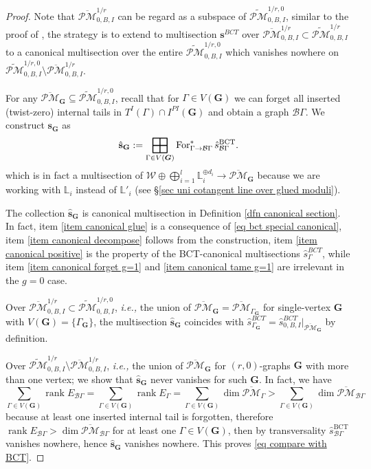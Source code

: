 \documentclass[11pt]{amsart}
\theoremstyle{definition}
\theoremstyle{remark}
\newcommand{\oPMb}{{\overline{\mathcal{PM}}}}
\newcommand{\<}{\left<}
\renewcommand{\>}{\right>}
\numberwithin{equation}{section}
\DeclareMathOperator{\rk}{rank}
\DeclareMathOperator*{\bboxplus}{\scalerel*{\boxplus}{\sum}}
\begin{document}
    
    \begin{proof}
        Note that $\oPMb^{1/r}_{0,B,I}$ can be regard as a subspace of $\widetilde{\mathcal{PM}}^{1/r,0}_{0,B,I}$, similar to the proof of \cite[Theorem 5.2]{TZ2}, the strategy is to extend to multisection $\mathbf{s}^{BCT}$ over $\oPMb^{1/r}_{0,B,I}\subset \widetilde{\mathcal{PM}}^{1/r}_{0,B,I}$ to a canonical multisection over the entire $\widetilde{\mathcal{PM}}^{1/r,0}_{0,B,I}$ which vanishes nowhere on $\widetilde{\mathcal{PM}}^{1/r,0}_{0,B,I} \setminus \oPMb^{1/r}_{0,B,I}$.

        

    For any $\oPMb_{\bm{G}}\subseteq \widetilde{\mathcal{PM}}^{1/r,0}_{0,B,I} $, recall that for $\Gamma \in V(\bm{G})$ we can forget all inserted (twist-zero) internal tails in $T^I(\Gamma)\cap I^{PI}(\bm{G})$ and obtain a graph $\mathcal B \Gamma$. We construct $\mathbf{s}_{\mathbf{G}}$ as
    $$
    \hat{\mathbf{s}}_{\mathbf{G}}:=\bboxplus_{\Gamma \in V(\bm{G})}  \operatorname{For}^*_{\Gamma \to \mathcal B \Gamma} \hat {s}^{\text{BCT}}_{\mathcal B \Gamma}.
    $$
    which is in fact a multisection of $\mathcal W \oplus \bigoplus_{i=1}^l \mathbb L_i^{\oplus d_i}\to \oPMb_{\bm{G}}$ because we are working with $\mathbb L_i$ instead of $\mathbb L'_i$ (see \S \ref{sec uni cotangent line over glued moduli}).

    The collection $\hat {\mathbf{s}}_{\mathbf{G}}$ is canonical multisection in Definition \ref{dfn canonical section}. In fact, item \ref{item canonical glue} is a consequence of \eqref{eq bct special canonical}, item \ref{item canonical decompose} follows from the construction, item \ref{item canonical positive} is the property of the BCT-canonical multisections $\hat{s}^{BCT}_{\Gamma}$, while item \ref{item canonical forget g=1} and \ref{item canonical tame g=1} are irrelevant in the $g=0$ case.

    Over $\oPMb^{1/r}_{0,B,I}\subset \widetilde{\mathcal{PM}}^{1/r,0}_{0,B,I}$, \textit{i.e.,} the union of $\oPMb_{\bm{G}}=\oPMb_{\Gamma_{\bm{G}}}$ for single-vertex $\bm{G}$ with $V(\bm{G})=\{\Gamma_{\bm{G}}\}$, the multisection $\hat{\bm{s}}_{\mathbf{G}}$ coincides with $\hat{s}^{BCT}_{\Gamma_{\bm{G}}}=\hat {s}_{0,B,I}^{BCT}\vert_{\oPMb_{\bm{G}}}$ by definition. 
    
    Over $\widetilde{\mathcal{PM}}^{1/r}_{0,B,I}\setminus \oPMb^{1/r}_{0,B,I} $, \textit{i.e.,} the union of $\oPMb_{\bm{G}}$ for $(r,0)$-graphs $\bm{G}$ with more than one vertex; we show that $\hat{\bm{s}}_{\bm{G}}$ never vanishes for such $\bm{G}$. In fact, we have
    $$
   \sum_{\Gamma\in V(\bm{G})}\rk E_{\mathcal B\Gamma}= \sum_{\Gamma\in V(\bm{G})}\rk E_{\Gamma} =\sum_{\Gamma\in V(\bm{G})} \dim \oPMb_{\Gamma}>\sum_{\Gamma\in V(\bm{G})} \dim \oPMb_{\mathcal B\Gamma}
    $$
    because at least one inserted internal tail is forgotten, therefore $\rk E_{\mathcal B\Gamma}>\dim \oPMb_{\mathcal B\Gamma}$ for at least one $\Gamma \in V(\bm{G})$, then by transversality $\hat {s}^{\text{BCT}}_{\mathcal B \Gamma}$ vanishes nowhere, hence $\hat{\bm{s}}_{\bm{G}}$ vanishes nowhere. This proves \eqref{eq compare with BCT}.
        
        
    \end{proof}
\end{document}
